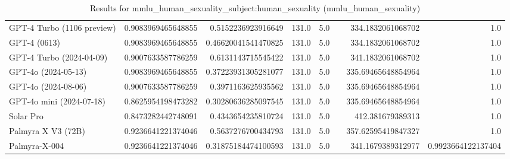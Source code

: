 \begin{table}[htp]
{\begin{tabular}{lrrrrrrr}
GPT-4 Turbo (1106 preview) & 0.9083969465648855 & 0.5152236923916649 & 131.0 & 5.0 &  & 334.1832061068702 & 1.0 \\
GPT-4 (0613) & 0.9083969465648855 & 0.46620041541470825 & 131.0 & 5.0 &  & 334.1832061068702 & 1.0 \\
GPT-4 Turbo (2024-04-09) & 0.9007633587786259 & 0.6131143715545422 & 131.0 & 5.0 &  & 341.1832061068702 & 1.0 \\
GPT-4o (2024-05-13) & 0.9083969465648855 & 0.37223931305281077 & 131.0 & 5.0 &  & 335.69465648854964 & 1.0 \\
GPT-4o (2024-08-06) & 0.9007633587786259 & 0.3971163625935562 & 131.0 & 5.0 &  & 335.69465648854964 & 1.0 \\
GPT-4o mini (2024-07-18) & 0.8625954198473282 & 0.30280636285097545 & 131.0 & 5.0 &  & 335.69465648854964 & 1.0 \\
Solar Pro & 0.8473282442748091 & 0.4343654235810724 & 131.0 & 5.0 &  & 412.381679389313 & 1.0 \\
Palmyra X V3 (72B) & 0.9236641221374046 & 0.5637276700434793 & 131.0 & 5.0 &  & 357.62595419847327 & 1.0 \\
Palmyra-X-004 & 0.9236641221374046 & 0.31875184474100593 & 131.0 & 5.0 &  & 341.1679389312977 & 0.9923664122137404 \\
\bottomrule
\end{tabular}}
\caption{Results for mmlu_human_sexuality_subject:human_sexuality (mmlu_human_sexuality)}
\label{fig:mmlu_human_sexuality_subject:human_sexuality (mmlu_human_sexuality)}
\end{table}